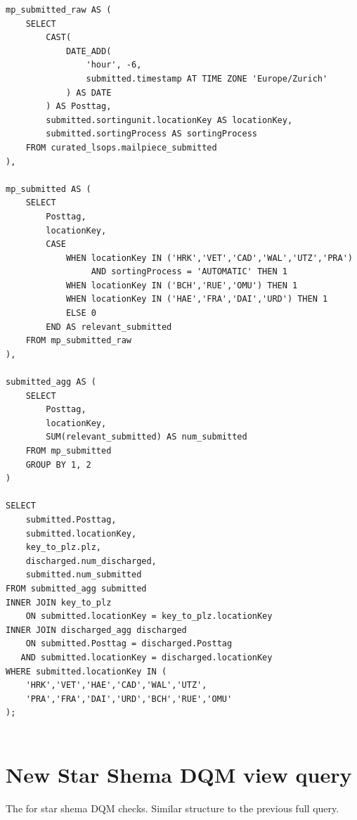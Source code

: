 \begin{lstlisting}[style=sqlstyle]
mp_submitted_raw AS (
    SELECT
        CAST(
            DATE_ADD(
                'hour', -6,
                submitted.timestamp AT TIME ZONE 'Europe/Zurich'
            ) AS DATE
        ) AS Posttag,
        submitted.sortingunit.locationKey AS locationKey,
        submitted.sortingProcess AS sortingProcess
    FROM curated_lsops.mailpiece_submitted
),

mp_submitted AS (
    SELECT
        Posttag,
        locationKey,
        CASE
            WHEN locationKey IN ('HRK','VET','CAD','WAL','UTZ','PRA')
                 AND sortingProcess = 'AUTOMATIC' THEN 1
            WHEN locationKey IN ('BCH','RUE','OMU') THEN 1
            WHEN locationKey IN ('HAE','FRA','DAI','URD') THEN 1
            ELSE 0
        END AS relevant_submitted
    FROM mp_submitted_raw
),

submitted_agg AS (
    SELECT
        Posttag,
        locationKey,
        SUM(relevant_submitted) AS num_submitted
    FROM mp_submitted
    GROUP BY 1, 2
)

SELECT
    submitted.Posttag,
    submitted.locationKey,
    key_to_plz.plz,
    discharged.num_discharged,
    submitted.num_submitted
FROM submitted_agg submitted
INNER JOIN key_to_plz
    ON submitted.locationKey = key_to_plz.locationKey
INNER JOIN discharged_agg discharged
    ON submitted.Posttag = discharged.Posttag
   AND submitted.locationKey = discharged.locationKey
WHERE submitted.locationKey IN (
    'HRK','VET','HAE','CAD','WAL','UTZ',
    'PRA','FRA','DAI','URD','BCH','RUE','OMU'
);


\end{lstlisting}

\section{New Star Shema DQM view query}
\label{newStarShemaDQMquery}
The for star shema DQM checks. Similar structure to the previous full query.

